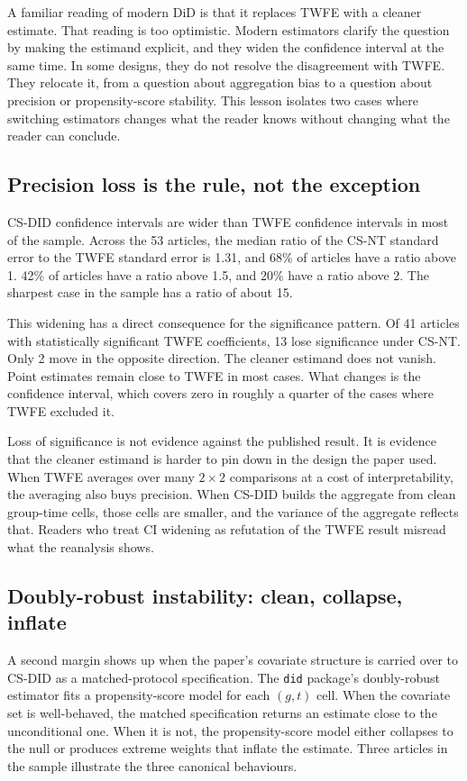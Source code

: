 A familiar reading of modern DiD is that it replaces TWFE with a cleaner estimate. That reading is too optimistic. Modern estimators clarify the question by making the estimand explicit, and they widen the confidence interval at the same time. In some designs, they do not resolve the disagreement with TWFE. They relocate it, from a question about aggregation bias to a question about precision or propensity-score stability. This lesson isolates two cases where switching estimators changes what the reader knows without changing what the reader can conclude.

\subsection{Precision loss is the rule, not the exception}

CS-DID confidence intervals are wider than TWFE confidence intervals in most of the sample. Across the 53 articles, the median ratio of the CS-NT standard error to the TWFE standard error is 1.31, and 68\% of articles have a ratio above 1. 42\% of articles have a ratio above 1.5, and 20\% have a ratio above 2. The sharpest case in the sample has a ratio of about 15.

This widening has a direct consequence for the significance pattern. Of 41 articles with statistically significant TWFE coefficients, 13 lose significance under CS-NT. Only 2 move in the opposite direction. The cleaner estimand does not vanish. Point estimates remain close to TWFE in most cases. What changes is the confidence interval, which covers zero in roughly a quarter of the cases where TWFE excluded it.

Loss of significance is not evidence against the published result. It is evidence that the cleaner estimand is harder to pin down in the design the paper used. When TWFE averages over many $2\times2$ comparisons at a cost of interpretability, the averaging also buys precision. When CS-DID builds the aggregate from clean group-time cells, those cells are smaller, and the variance of the aggregate reflects that. Readers who treat CI widening as refutation of the TWFE result misread what the reanalysis shows.

\subsection{Doubly-robust instability: clean, collapse, inflate}

A second margin shows up when the paper's covariate structure is carried over to CS-DID as a matched-protocol specification. The \texttt{did} package's doubly-robust estimator fits a propensity-score model for each $(g,t)$ cell. When the covariate set is well-behaved, the matched specification returns an estimate close to the unconditional one. When it is not, the propensity-score model either collapses to the null or produces extreme weights that inflate the estimate. Three articles in the sample illustrate the three canonical behaviours.

